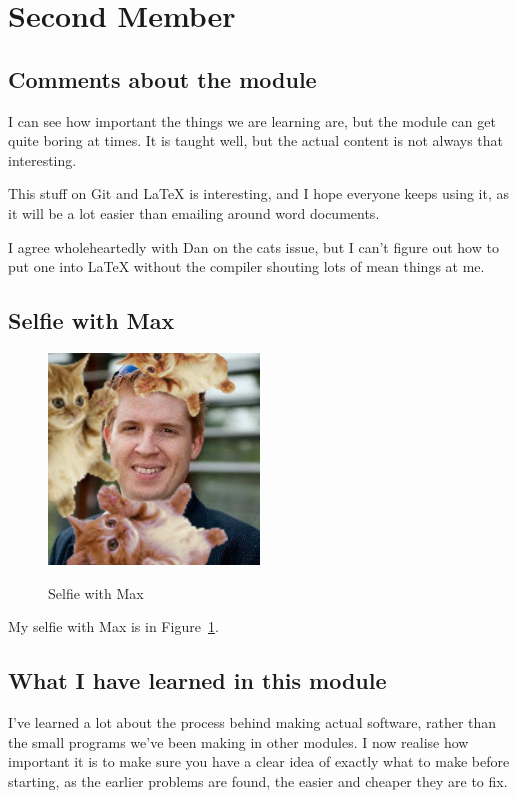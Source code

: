 \section{Second Member}

\subsection{Comments about the module}
I can see how important the things we are learning are, but the module can get quite boring at times. It is taught well, but the actual content is not always that interesting.

This stuff on Git and LaTeX is interesting, and I hope everyone keeps using it, as it will be a lot easier than emailing around word documents.

I agree wholeheartedly with Dan on the cats issue, but I can't figure out how to put one into LaTeX without the compiler shouting lots of mean things at me.

\subsection{Selfie with Max}

\begin{figure}[h]
\caption{Selfie with Max}
\centering
\includegraphics[width=0.5\textwidth]{maxcats}
\label{fig:cats}
\end{figure}

My selfie with Max is in Figure~\ref{fig:cats}.

\subsection{What I have learned in this module}
I've learned a lot about the process behind making actual software, rather than the small programs we've been making in other modules. I now realise how important it is to make sure you have a clear idea of exactly what to make before starting, as the earlier problems are found, the easier and cheaper they are to fix.
